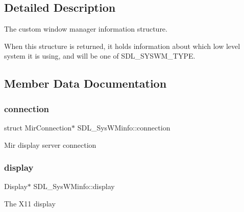\begin{DoxyCompactItemize}
\begin{tabbing}
\end{tabbing}\end{DoxyCompactItemize}


\subsection{Detailed Description}
The custom window manager information structure.

When this structure is returned, it holds information about which low level system it is using, and will be one of S\+D\+L\+\_\+\+S\+Y\+S\+W\+M\+\_\+\+T\+Y\+PE. 

\subsection{Member Data Documentation}
\mbox{\label{struct_s_d_l___sys_w_minfo_a7fda623f016c075e04e3a377379c2d0f}} 
\subsubsection{\texorpdfstring{connection}{connection}}
{\footnotesize\ttfamily struct Mir\+Connection$\ast$ S\+D\+L\+\_\+\+Sys\+W\+Minfo\+::connection}

Mir display server connection \mbox{\label{struct_s_d_l___sys_w_minfo_a58ef8bc8e1065e95e75a08d08f4a4741}} 
\subsubsection{\texorpdfstring{display}{display}\hspace{0.1cm}{\footnotesize\ttfamily [1/2]}}
{\footnotesize\ttfamily Display$\ast$ S\+D\+L\+\_\+\+Sys\+W\+Minfo\+::display}

The X11 display \mbox{\label{struct_s_d_l___sys_w_minfo_a148aa67e71b758f6930165fbc027e2b2}} 
